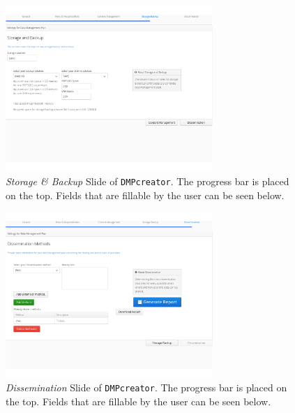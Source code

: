 \begin{figure}[]
	\centering
	\includegraphics[width=0.7\textwidth]{pictures/StorageBackup.png}
	\caption{\textit{Storage \& Backup} Slide of \texttt{DMPcreator}. The progress bar is placed on the top. Fields that are fillable by the user can be seen below.}
		\label{StorageBackupSlide}
\end{figure}

\begin{figure}[]
	\centering
	\label{Dissemination}
	\includegraphics[width=0.7\textwidth]{pictures/Dissemination.png}
	\caption{\textit{Dissemination} Slide of \texttt{DMPcreator}. The progress bar is placed on the top. Fields that are fillable by the user can be seen below.}
\end{figure}
